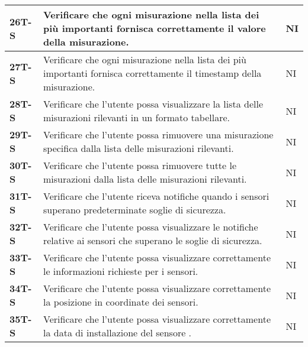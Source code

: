 \begin{longtable}{|>{\raggedright\arraybackslash}m{}|>{\raggedright\arraybackslash}m{}|>{\raggedright\arraybackslash}m{}|}
	\hline
	\textbf{26T-S}  & Verificare che ogni misurazione nella lista dei più importanti fornisca correttamente il valore della misurazione.                                                                 & NI             \\
	\hline
	\textbf{27T-S}  & Verificare che ogni misurazione nella lista dei più importanti fornisca correttamente il timestamp della misurazione.                                                              & NI             \\
	\hline
	\textbf{28T-S}  & Verificare che l’utente possa visualizzare la lista delle misurazioni rilevanti in un formato tabellare.                                                                           & NI             \\ %
	\hline
	\textbf{29T-S}  & Verificare che l’utente possa rimuovere una misurazione specifica dalla lista delle misurazioni rilevanti.                                                                         & NI             \\
	\hline
	\textbf{30T-S}  & Verificare che l’utente possa rimuovere tutte le misurazioni dalla lista delle misurazioni rilevanti.                                                                              & NI             \\
	\hline
	\textbf{31T-S}  & Verificare che l’utente riceva notifiche quando i sensori superano predeterminate soglie di sicurezza.                                                                             & NI             \\
	\hline
	\textbf{32T-S}  & Verificare che l’utente possa visualizzare le notifiche relative ai sensori che superano le soglie di sicurezza.                                                                   & NI             \\
	\hline
	\textbf{33T-S}  & Verificare che l’utente possa visualizzare correttamente le informazioni richieste per i sensori.                                                                                  & NI             \\
	\hline
	\textbf{34T-S}  & Verificare che l’utente possa visualizzare correttamente la posizione in coordinate dei sensori.                                                                                   & NI             \\
	\hline
	\textbf{35T-S}  & Verificare che l’utente possa visualizzare correttamente la data di installazione del sensore .                                                                                    & NI             \\

\end{longtable}
